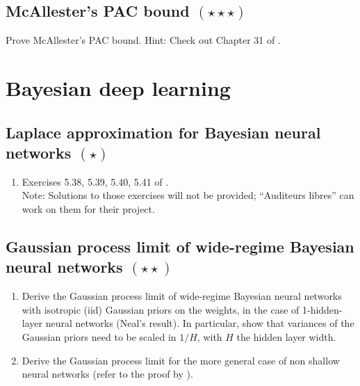 \documentclass{article}
\begin{document}
\subsection{McAllester's PAC bound $(\star\star\star)$}
Prove McAllester's PAC bound. Hint: Check out Chapter 31 of \citep{ShBe14}.

\section{Bayesian deep learning}

\subsection{Laplace approximation for Bayesian neural networks $(\star)$}
\begin{enumerate}
\item Exercises 5.38, 5.39, 5.40, 5.41 
of \cite{Bis06}.\\
Note: Solutions to those exercises will not be provided; ``Auditeurs libres'' can work on them for their project.
\end{enumerate}

\subsection{Gaussian process limit of wide-regime Bayesian neural networks $(\star\star)$}
\begin{enumerate}
\item 
Derive the Gaussian process limit of wide-regime Bayesian neural networks with isotropic (iid) Gaussian priors on the weights, in the case of 1-hidden-layer neural networks (Neal's result). In particular, show that variances of the Gaussian priors need to be scaled in $1/H$, with $H$ the hidden layer width. 
\item Derive the Gaussian process limit for the more general case of non shallow neural networks (refer to the proof by \cite{matthews2018gaussian}).
\end{enumerate}

\printbibliography
\end{document}
